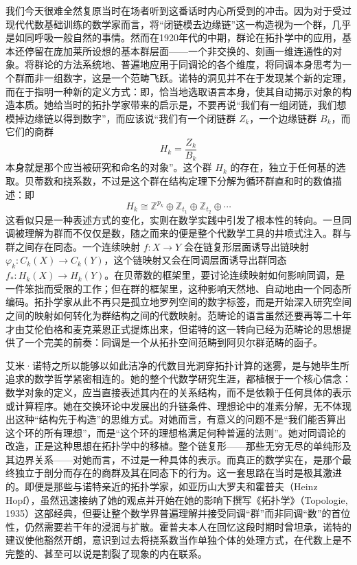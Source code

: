 \documentclass[12pt,a4paper]{article}
\begin{document}
我们今天很难全然复原当时在场者听到这番话时内心所受到的冲击。因为对于受过现代代数基础训练的数学家而言，将“闭链模去边缘链”这一构造视为一个群，几乎是如同呼吸一般自然的事情。然而在1920年代的中期，群论在拓扑学中的应用，基本还停留在庞加莱所设想的基本群层面——一个非交换的、刻画一维连通性的对象。将群论的方法系统地、普遍地应用于同调论的各个维度，将同调本身思考为一个群而非一组数字，这是一个范畴飞跃。诺特的洞见并不在于发现某个新的定理，而在于指明一种新的定义方式：即，恰当地选取语言本身，使其自动揭示对象的构造本质。她给当时的拓扑学家带来的启示是，不要再说“我们有一组闭链，我们想模掉边缘链以得到数字”，而应该说“我们有一个闭链群 $Z_k$，一个边缘链群 $B_k$，而它们的商群
$$
H_k = \frac{Z_k}{B_k}
$$
本身就是那个应当被研究和命名的对象”。这个群 $H_k$ 的存在，独立于任何基的选取。贝蒂数和挠系数，不过是这个群在结构定理下分解为循环群直和时的数值描述：即
$$
H_k \cong \mathbb{Z}^{p_k} \oplus \mathbb{Z}_{t_1} \oplus \mathbb{Z}_{t_2} \oplus \cdots
$$
这看似只是一种表述方式的变化，实则在数学实践中引发了根本性的转向。一旦同调被理解为群而不仅仅是数，随之而来的便是整个代数学工具的井喷式注入。群与群之间存在同态。一个连续映射 $f: X \to Y$ 会在链复形层面诱导出链映射 $\varphi_k: C_k(X) \to C_k(Y)$，这个链映射又会在同调层面诱导出群同态 $f_*: H_k(X) \to H_k(Y)$。在贝蒂数的框架里，要讨论连续映射如何影响同调，是一件笨拙而受限的工作；但在群的框架里，这种影响天然地、自动地由一个同态所编码。拓扑学家从此不再只是孤立地罗列空间的数字标签，而是开始深入研究空间之间的映射如何转化为群结构之间的代数映射。范畴论的语言虽然还要再等二十年才由艾伦伯格和麦克莱恩正式提炼出来，但诺特的这一转向已经为范畴论的思想提供了一个完美的前奏：同调是一个从拓扑空间范畴到阿贝尔群范畴的函子。

艾米·诺特之所以能够以如此洁净的代数目光洞穿拓扑计算的迷雾，是与她毕生所追求的数学哲学紧密相连的。她的整个代数学研究生涯，都植根于一个核心信念：数学对象的定义，应当直接表述其内在的关系结构，而不是依赖于任何具体的表示或计算程序。她在交换环论中发展出的升链条件、理想论中的准素分解，无不体现出这种“结构先于构造”的思维方式。对她而言，有意义的问题不是“我们能否算出这个环的所有理想”，而是“这个环的理想格满足何种普遍的法则”。她对同调论的改造，正是这种思想在拓扑学中的移植。整个链复形——那些无穷无尽的单纯形及其边界关系——对她而言，不过是一种具体的表示。而真正的数学实在，是那个最终独立于剖分而存在的商群及其在同态下的行为。这一套思路在当时是极其激进的。即便是那些与诺特亲近的拓扑学家，如亚历山大罗夫和霍普夫（Heinz Hopf），虽然迅速接纳了她的观点并开始在她的影响下撰写《拓扑学》（Topologie, 1935）这部经典，但要让整个数学界普遍理解并接受同调“群”而非同调“数”的首位性，仍然需要若干年的浸润与扩散。霍普夫本人在回忆这段时期时曾坦承，诺特的建议使他豁然开朗，意识到过去将挠系数当作单独个体的处理方式，在代数上是不完整的、甚至可以说是割裂了现象的内在联系。
\end{document}
